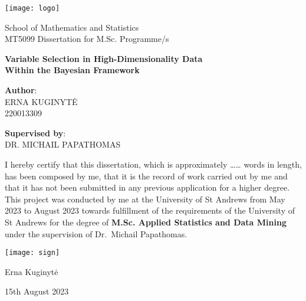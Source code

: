 \documentclass[
]{article}
\author{}
\date{\vspace{-2.5em}}
\begin{document}
\begin{center}\texttt{[image: logo]} \end{center}

\centering

School of Mathematics and Statistics\\
MT5099 Dissertation for M.Sc. Programme/s

\vspace{0.75cm}

\begin{center}
    {\LARGE \textbf{Variable Selection in High-Dimensionality Data}} \\
    {\LARGE \textbf{Within the Bayesian Framework}}
\end{center}

\vspace{0.5cm}

\textbf{Author}:\\
ERNA KUGINYTĖ\\
220013309

\textbf{Supervised by}:\\
DR. MICHAIL PAPATHOMAS

\vspace{0.75cm}

I hereby certify that this dissertation, which is approximately
\ldots\ldots{} words in length, has been composed by me, that it is the
record of work carried out by me and that it has not been submitted in
any previous application for a higher degree. This project was conducted
by me at the University of St Andrews from May 2023 to August 2023
towards fulfillment of the requirements of the University of St Andrews
for the degree of \textbf{M.Sc. Applied Statistics and Data Mining}
under the supervision of Dr.~Michail Papathomas.

\vspace{0.5cm}

\begin{center}\texttt{[image: sign]} \end{center}

Erna Kuginytė

\vspace{0.5cm}

15th August 2023
\end{document}
